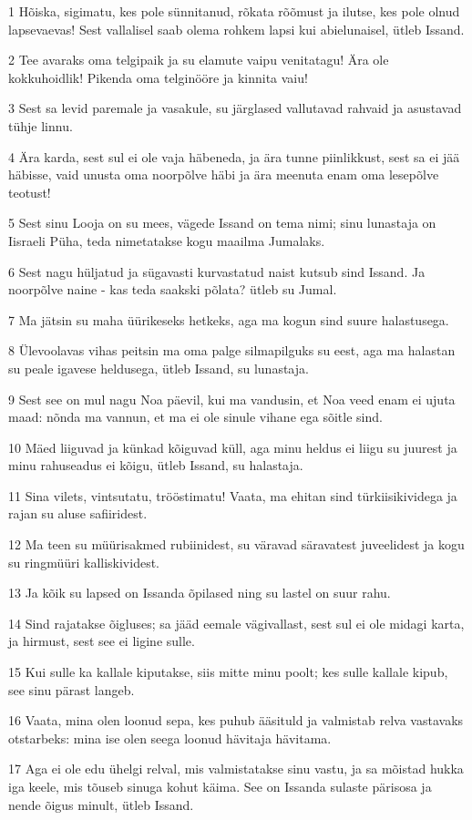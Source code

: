 \par 1 Hõiska, sigimatu, kes pole sünnitanud, rõkata rõõmust ja ilutse, kes pole olnud lapsevaevas! Sest vallalisel saab olema rohkem lapsi kui abielunaisel, ütleb Issand.
\par 2 Tee avaraks oma telgipaik ja su elamute vaipu venitatagu! Ära ole kokkuhoidlik! Pikenda oma telginööre ja kinnita vaiu!
\par 3 Sest sa levid paremale ja vasakule, su järglased vallutavad rahvaid ja asustavad tühje linnu.
\par 4 Ära karda, sest sul ei ole vaja häbeneda, ja ära tunne piinlikkust, sest sa ei jää häbisse, vaid unusta oma noorpõlve häbi ja ära meenuta enam oma lesepõlve teotust!
\par 5 Sest sinu Looja on su mees, vägede Issand on tema nimi; sinu lunastaja on Iisraeli Püha, teda nimetatakse kogu maailma Jumalaks.
\par 6 Sest nagu hüljatud ja sügavasti kurvastatud naist kutsub sind Issand. Ja noorpõlve naine - kas teda saakski põlata? ütleb su Jumal.
\par 7 Ma jätsin su maha üürikeseks hetkeks, aga ma kogun sind suure halastusega.
\par 8 Ülevoolavas vihas peitsin ma oma palge silmapilguks su eest, aga ma halastan su peale igavese heldusega, ütleb Issand, su lunastaja.
\par 9 Sest see on mul nagu Noa päevil, kui ma vandusin, et Noa veed enam ei ujuta maad: nõnda ma vannun, et ma ei ole sinule vihane ega sõitle sind.
\par 10 Mäed liiguvad ja künkad kõiguvad küll, aga minu heldus ei liigu su juurest ja minu rahuseadus ei kõigu, ütleb Issand, su halastaja.
\par 11 Sina vilets, vintsutatu, trööstimatu! Vaata, ma ehitan sind türkiisikividega ja rajan su aluse safiiridest.
\par 12 Ma teen su müürisakmed rubiinidest, su väravad säravatest juveelidest ja kogu su ringmüüri kalliskividest.
\par 13 Ja kõik su lapsed on Issanda õpilased ning su lastel on suur rahu.
\par 14 Sind rajatakse õigluses; sa jääd eemale vägivallast, sest sul ei ole midagi karta, ja hirmust, sest see ei ligine sulle.
\par 15 Kui sulle ka kallale kiputakse, siis mitte minu poolt; kes sulle kallale kipub, see sinu pärast langeb.
\par 16 Vaata, mina olen loonud sepa, kes puhub ääsituld ja valmistab relva vastavaks otstarbeks: mina ise olen seega loonud hävitaja hävitama.
\par 17 Aga ei ole edu ühelgi relval, mis valmistatakse sinu vastu, ja sa mõistad hukka iga keele, mis tõuseb sinuga kohut käima. See on Issanda sulaste pärisosa ja nende õigus minult, ütleb Issand.


